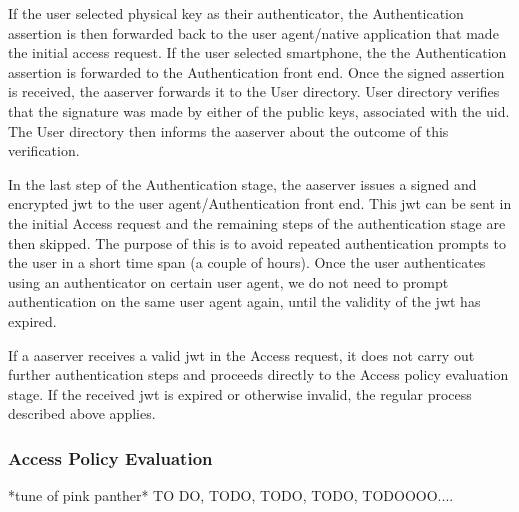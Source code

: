 If the user selected physical key as their authenticator, the Authentication assertion is then forwarded back to the user agent/native application that made the initial access request. If the user selected smartphone, the the Authentication assertion is forwarded to the Authentication front end. Once the signed assertion is received, the \acrshort{aaserver} forwards it to the User directory. User directory verifies that the signature was made by either of the public keys, associated with the \acrshort{uid}. The User directory then informs the \acrshort{aaserver} about the outcome of this verification. 

In the last step of the Authentication stage, the \acrshort{aaserver} issues a signed and encrypted \acrshort{jwt} to the user agent/Authentication front end. This \acrshort{jwt} can be sent in the initial Access request and the remaining steps of the authentication stage are then skipped. The purpose of this is to avoid repeated authentication prompts to the user in a short time span (a couple of hours). Once the user authenticates using an authenticator on certain user agent, we do not need to prompt authentication on the same user agent again, until the validity of the \acrshort{jwt} has expired.

If a \acrshort{aaserver} receives a valid \acrshort{jwt} in the Access request, it does not carry out further authentication steps and proceeds directly to the Access policy evaluation stage. If the received \acrshort{jwt} is expired or otherwise invalid, the regular process described above applies.

\subsubsection{Access Policy Evaluation}

*tune of pink panther*
TO DO, TODO, TODO, TODO, TODOOOO....